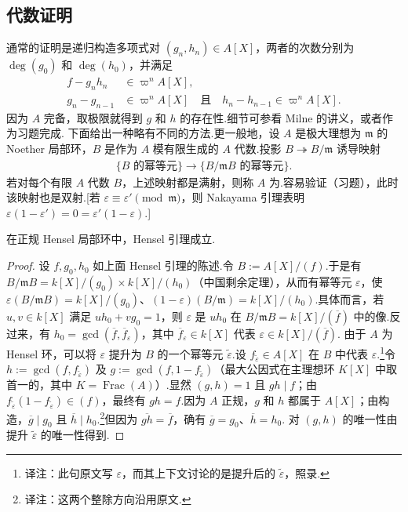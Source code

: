 \subsection{代数证明}\label{sec:nt-4-3-2}
通常的证明是递归构造多项式对 $(g_n,h_n)\in A[X]$，两者的次数分别为 $\deg(g_0)$ 和 $\deg(h_0)$，并满足
\begin{align*}
f-g_nh_n&\in\varpi^nA[X],\\
g_n-g_{n-1}&\in\varpi^nA[X]\quad\text{且}\quad h_n-h_{n-1}\in\varpi^nA[X].
\end{align*}
因为 $A$ 完备，取极限就得到 $g$ 和 $h$ 的存在性.细节可参看 Milne 的讲义，或者作为习题完成.
下面给出一种略有不同的方法.更一般地，设 $A$ 是极大理想为 $\mathfrak m$ 的 Noether 局部环，$B$ 是作为 $A$ 模有限生成的 $A$ 代数.投影 $B\twoheadrightarrow B/\mathfrak m$ 诱导映射
\begin{align*}
\{B\text{ 的幂等元}\}\longrightarrow\{B/\mathfrak mB\text{ 的幂等元}\}.
\end{align*}
若对每个有限 $A$ 代数 $B$，上述映射都是满射，则称 $A$ 为.容易验证（习题），此时该映射也是双射.[若 $\varepsilon\equiv\varepsilon'\pmod{\mathfrak m}$，则 Nakayama 引理表明 $\varepsilon(1-\varepsilon')=0=\varepsilon'(1-\varepsilon)$.]
\begin{proposition*}
在正规 Hensel 局部环中，Hensel 引理成立.
\end{proposition*}
\begin{proof}
设 $f,g_0,h_0$ 如上面 Hensel 引理的陈述.令 $B:=A[X]/(f)$.于是有 $B/\mathfrak mB=k[X]/(g_0)\times k[X]/(h_0)$（中国剩余定理），从而有幂等元 $\varepsilon$，使 $\varepsilon(B/\mathfrak mB)=k[X]/(g_0)$、$(1-\varepsilon)(B/\mathfrak m)=k[X]/(h_0)$.具体而言，若 $u,v\in k[X]$ 满足 $uh_0+vg_0=1$，则 $\varepsilon$ 是 $uh_0$ 在 $B/\mathfrak mB=k[X]/(\overline f)$ 中的像.反过来，有 $h_0=\gcd(\overline f,\overline f_{\varepsilon})$，其中 $\overline f_{\varepsilon}\in k[X]$ 代表 $\varepsilon\in k[X]/(\overline f)$.
由于 $A$ 为 Hensel 环，可以将 $\varepsilon$ 提升为 $B$ 的一个幂等元 $\widetilde\varepsilon$.设 $f_{\widetilde\varepsilon}\in A[X]$ 在 $B$ 中代表 $\varepsilon$.\footnote{译注：此句原文写 $\varepsilon$，而其上下文讨论的是提升后的 $\widetilde\varepsilon$，照录.}令 $h:=\gcd(f,f_{\widetilde\varepsilon})$ 及 $g:=\gcd(f,1-f_{\widetilde\varepsilon})$（最大公因式在主理想环 $K[X]$ 中取首一的，其中 $K=\operatorname{Frac}(A)$）.显然 $(g,h)=1$ 且 $gh\mid f$；由 $f_{\widetilde\varepsilon}(1-f_{\widetilde\varepsilon})\in(f)$，最终有 $gh=f$.因为 $A$ 正规，$g$ 和 $h$ 都属于 $A[X]$；由构造，$\overline g\mid g_0$ 且 $\overline h\mid h_0$.\footnote{译注：这两个整除方向沿用原文.}但因为 $\overline{gh}=\overline f$，确有 $\overline g=g_0$、$\overline h=h_0$.
对 $(g,h)$ 的唯一性由提升 $\widetilde\varepsilon$ 的唯一性得到.
\end{proof}
